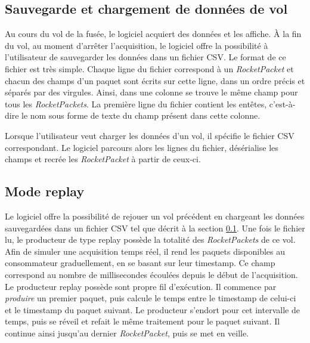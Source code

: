 \subsection{Sauvegarde et chargement de données de vol}
\label{s:sauvegarde}
Au cours du vol de la fusée, le logiciel acquiert des données et les affiche.
À la fin du vol, au moment d'arrêter l'acquisition, le logiciel offre la possibilité à l'utilisateur de sauvegarder les données dans un fichier CSV.
Le format de ce fichier est très simple.
Chaque ligne du fichier correspond à un \emph{RocketPacket} et chacun des champs d'un paquet sont écrits sur cette ligne, dans un ordre précis et séparés par des virgules.
Ainsi, dans une colonne se trouve le même champ pour tous les \emph{RocketPackets}.
La première ligne du fichier contient les entêtes, c'est-à-dire le nom sous forme de texte du champ présent dans cette colonne.

Lorsque l'utilisateur veut charger les données d'un vol, il spécifie le fichier CSV correspondant.
Le logiciel parcours alors les lignes du fichier, désérialise les champs et recrée les \emph{RocketPacket} à partir de ceux-ci.

\subsection{Mode replay}
\label{s:mode_replay}
Le logiciel offre la possibilité de rejouer un vol précédent en chargeant les données sauvegardées dans un fichier CSV tel que décrit à la section \ref{s:sauvegarde}.
Une fois le fichier lu, le producteur de type replay possède la totalité des \emph{RocketPackets} de ce vol.
Afin de simuler une acquisition temps réel, il rend les paquets disponibles au consommateur graduellement, en se basant sur leur timestamp.
Ce champ correspond au nombre de millisecondes écoulées depuis le début de l'acquisition.
Le producteur replay possède sont propre fil d'exécution.
Il commence par \emph{produire} un premier paquet, puis calcule le temps entre le timestamp de celui-ci et le timestamp du paquet suivant.
Le producteur s'endort pour cet intervalle de temps, puis se réveil et refait le même traitement pour le paquet suivant.
Il continue ainsi jusqu'au dernier \emph{RocketPacket}, puis se met en veille.

